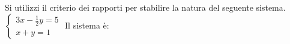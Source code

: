 Si utilizzi il criterio dei rapporti per stabilire la natura del seguente sistema.
 $\left\{\begin{array}{l}
 3x-\frac 1 2y=5
 \\
 x+y=1
 \end{array}\right.$ 
Il sistema è: 
